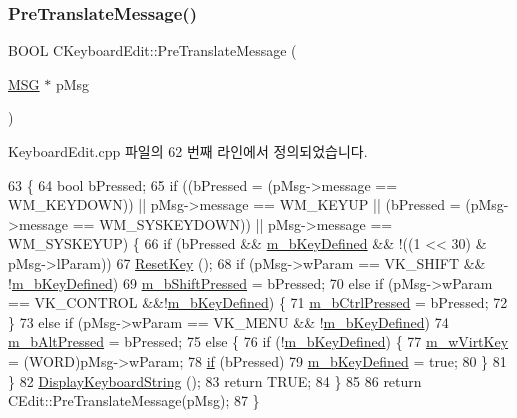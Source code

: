 \subsubsection{\texorpdfstring{Pre\+Translate\+Message()}{PreTranslateMessage()}}
{\footnotesize\ttfamily B\+O\+OL C\+Keyboard\+Edit\+::\+Pre\+Translate\+Message (\begin{DoxyParamCaption}\item[{\mbox{\hyperlink{prof_8cpp_a0c719c414608ef14852670b063876c07}{M\+SG}} $\ast$}]{p\+Msg }\end{DoxyParamCaption})\hspace{0.3cm}{\ttfamily [virtual]}}



Keyboard\+Edit.\+cpp 파일의 62 번째 라인에서 정의되었습니다.


\begin{DoxyCode}
63 \{
64   \textcolor{keywordtype}{bool} bPressed;
65   \textcolor{keywordflow}{if} ((bPressed = (pMsg->message == WM\_KEYDOWN)) || pMsg->message == WM\_KEYUP || (bPressed = (pMsg->message
       == WM\_SYSKEYDOWN)) || pMsg->message == WM\_SYSKEYUP) \{
66     \textcolor{keywordflow}{if} (bPressed && \mbox{\hyperlink{class_c_keyboard_edit_a9bf24703c8d1a3a019b43dc67c26c3a0}{m\_bKeyDefined}} && !((1 << 30) & pMsg->lParam))
67       \mbox{\hyperlink{class_c_keyboard_edit_ad0185cc0cad77250cc32ef1d9ffb8593}{ResetKey}} ();
68     \textcolor{keywordflow}{if} (pMsg->wParam == VK\_SHIFT && !\mbox{\hyperlink{class_c_keyboard_edit_a9bf24703c8d1a3a019b43dc67c26c3a0}{m\_bKeyDefined}})
69       \mbox{\hyperlink{class_c_keyboard_edit_ac4a4f45be9ef923961ab92a48a28f789}{m\_bShiftPressed}} = bPressed;
70     \textcolor{keywordflow}{else} \textcolor{keywordflow}{if} (pMsg->wParam == VK\_CONTROL &&!\mbox{\hyperlink{class_c_keyboard_edit_a9bf24703c8d1a3a019b43dc67c26c3a0}{m\_bKeyDefined}}) \{
71       \mbox{\hyperlink{class_c_keyboard_edit_a0dbb417bbaaeaa95c00fceaecd210064}{m\_bCtrlPressed}} = bPressed;
72     \}
73     \textcolor{keywordflow}{else} \textcolor{keywordflow}{if} (pMsg->wParam == VK\_MENU && !\mbox{\hyperlink{class_c_keyboard_edit_a9bf24703c8d1a3a019b43dc67c26c3a0}{m\_bKeyDefined}})
74       \mbox{\hyperlink{class_c_keyboard_edit_a724b035848eeca7bebc24e1309afeb6d}{m\_bAltPressed}} = bPressed;
75     \textcolor{keywordflow}{else} \{
76       \textcolor{keywordflow}{if} (!\mbox{\hyperlink{class_c_keyboard_edit_a9bf24703c8d1a3a019b43dc67c26c3a0}{m\_bKeyDefined}}) \{
77         \mbox{\hyperlink{class_c_keyboard_edit_a6a4efef92e151002720d0d930db29521}{m\_wVirtKey}} = (WORD)pMsg->wParam;
78         \mbox{\hyperlink{arm-new_8h_a93120066fd6daa54150af823953378d1}{if}} (bPressed)
79           \mbox{\hyperlink{class_c_keyboard_edit_a9bf24703c8d1a3a019b43dc67c26c3a0}{m\_bKeyDefined}} = \textcolor{keyword}{true};
80       \}
81     \}
82     \mbox{\hyperlink{class_c_keyboard_edit_a432e346d4d5285064b5e92ff4c6a0385}{DisplayKeyboardString}} ();
83     \textcolor{keywordflow}{return} TRUE;
84   \}
85         
86   \textcolor{keywordflow}{return} CEdit::PreTranslateMessage(pMsg);
87 \}
\end{DoxyCode}
